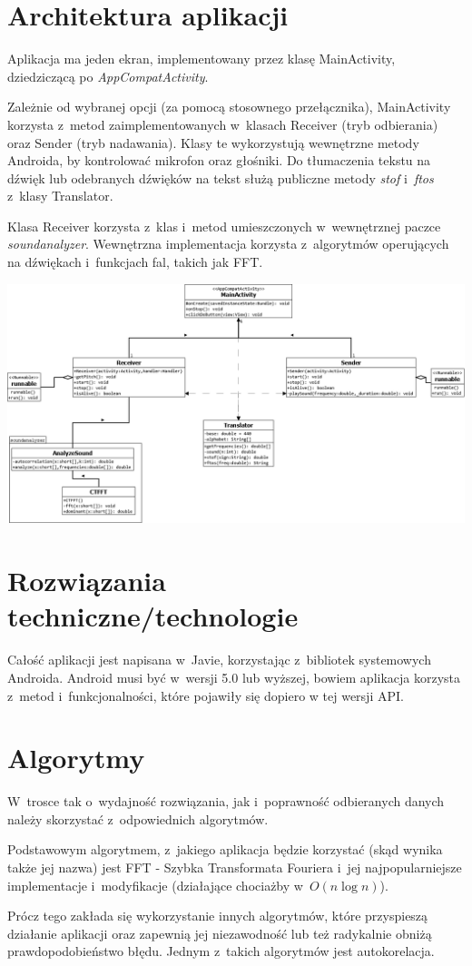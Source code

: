 \documentclass{article}
\begin{document}
\section{Architektura aplikacji}
Aplikacja ma jeden ekran, implementowany przez klasę MainActivity, dziedziczącą 
po \textit{AppCompatActivity}. \par
Zależnie od wybranej opcji (za pomocą stosownego przełącznika), MainActivity
korzysta z~metod zaimplementowanych w~klasach Receiver (tryb odbierania) oraz
Sender (tryb nadawania). Klasy te wykorzystują wewnętrzne metody Androida, by
kontrolować mikrofon oraz głośniki. Do tłumaczenia tekstu na dźwięk lub 
odebranych dźwięków na tekst służą publiczne metody \textit{stof} 
i~\textit{ftos} z~klasy Translator. \par
Klasa Receiver korzysta z~klas i~metod umieszczonych w~wewnętrznej paczce
\textit{soundanalyzer}. Wewnętrzna implementacja korzysta z~algorytmów
operujących na dźwiękach i~funkcjach fal, takich jak FFT. \par
\vspace{5mm}
\includegraphics[width=\textwidth]{app_uml.png}

\section{Rozwiązania techniczne/technologie}
Całość aplikacji jest napisana w~Javie, korzystając z~bibliotek systemowych
Androida. Android musi być w~wersji 5.0 lub wyższej, bowiem aplikacja korzysta
z~metod i~funkcjonalności, które pojawiły się dopiero w tej wersji API.

\section{Algorytmy}
W~trosce tak o~wydajność rozwiązania, jak i~poprawność odbieranych danych należy
skorzystać z~odpowiednich algorytmów. \par
Podstawowym algorytmem, z~jakiego aplikacja będzie korzystać (skąd wynika także
jej nazwa) jest FFT - Szybka Transformata Fouriera i~jej najpopularniejsze
implementacje i~modyfikacje (działające chociażby w~$O(n\log{}n)$). \par
Prócz tego zakłada się wykorzystanie innych algorytmów, które przyspieszą
działanie aplikacji oraz zapewnią jej niezawodność lub też radykalnie obniżą
prawdopodobieństwo błędu. Jednym z~takich algorytmów jest autokorelacja.
\end{document}
